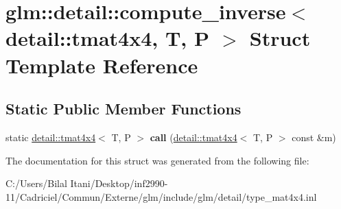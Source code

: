 \hypertarget{structglm_1_1detail_1_1compute__inverse_3_01detail_1_1tmat4x4_00_01_t_00_01_p_01_4}{}\section{glm\+:\+:detail\+:\+:compute\+\_\+inverse$<$ detail\+:\+:tmat4x4, T, P $>$ Struct Template Reference}
\label{structglm_1_1detail_1_1compute__inverse_3_01detail_1_1tmat4x4_00_01_t_00_01_p_01_4}
\subsection*{Static Public Member Functions}
\begin{DoxyCompactItemize}
\item 
static \hyperlink{structglm_1_1detail_1_1tmat4x4}{detail\+::tmat4x4}$<$ T, P $>$ {\bfseries call} (\hyperlink{structglm_1_1detail_1_1tmat4x4}{detail\+::tmat4x4}$<$ T, P $>$ const \&m)\hypertarget{structglm_1_1detail_1_1compute__inverse_3_01detail_1_1tmat4x4_00_01_t_00_01_p_01_4_a8fd080ed01ae197f2274742a8f1417f3}{}\label{structglm_1_1detail_1_1compute__inverse_3_01detail_1_1tmat4x4_00_01_t_00_01_p_01_4_a8fd080ed01ae197f2274742a8f1417f3}

\end{DoxyCompactItemize}


The documentation for this struct was generated from the following file\+:\begin{DoxyCompactItemize}
\item 
C\+:/\+Users/\+Bilal Itani/\+Desktop/inf2990-\/11/\+Cadriciel/\+Commun/\+Externe/glm/include/glm/detail/type\+\_\+mat4x4.\+inl\end{DoxyCompactItemize}
